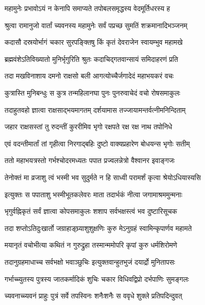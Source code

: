 \twolineshloka
{महामुनेः प्रभावोऽयं न केनापि समाप्यते}
{तपोबलसमृद्धस्य वेदमूर्तिधरस्य ह}%

\twolineshloka
{श्रुत्वा रामानुजो वार्तां च्यवनस्य महामुनेः}
{सर्वं पप्रच्छ सुमतिं शक्रमानादिभञ्जनम्}%


\twolineshloka
{कदासौ दस्रयोर्भागं चकार सुरपङ्क्तिषु}
{किं कृतं देवराजेन स्वायम्भुव महामखे}%


\twolineshloka
{ब्रह्मवंशेऽतिविख्यातो मुनिर्भृगुरिति श्रुतः}
{कदाचिद्गतवान्सायं समिदाहरणं प्रति}%

\twolineshloka
{तदा मखविनाशाय दमनो राक्षसो बली}
{आगत्योच्चैर्जगादेदं महाभयकरं वचः}%

\twolineshloka
{कुत्रास्ति मुनिबन्धुः स कुत्र तन्महिलानघा}
{पुनः पुनरुवाचेदं वचो रोषसमाकुलः}%

\twolineshloka
{तदाहुतवहो ज्ञात्वा राक्षसाद्भयमागतम्}
{दर्शयामास तज्जायामन्तर्वत्नीमनिन्दिताम्}%

\twolineshloka
{जहार राक्षसस्तां तु रुदन्तीं कुररीमिव}
{भृगो रक्षपते रक्ष रक्ष नाथ तपोनिधे}%

\twolineshloka
{एवं वदन्तीमार्तां तां गृहीत्वा निरगाद्बहिः}
{दुष्टो वाक्यप्रहारेण बोधयन्स भृगोः सतीम्}%

\twolineshloka
{ततो महाभयत्रस्तो गर्भश्चोदरमध्यतः}
{पपात प्रज्वलन्नेत्रो वैश्वानर इवाङ्गजः}%

\twolineshloka
{तेनोक्तं मा व्रजाशु त्वं भस्मी भव सुदुर्मते}
{न हि साध्वी परामर्शं कृत्वा श्रेयोऽधियास्यसि}%

\twolineshloka
{इत्युक्तः स पपाताशु भस्मीभूतकलेवरः}
{माता तदार्भकं नीत्वा जगामाश्रममुन्मनाः}%

\twolineshloka
{भृगुर्वह्निकृतं सर्वं ज्ञात्वा कोपसमाकुलः}
{शशाप सर्वभक्षस्त्वं भव दुष्टारिसूचक}%

\twolineshloka
{तदा शप्तोऽतिदुःखार्तो जग्राहाङ्घ्र्याशुशुक्षणिः}
{कुरु मेऽनुग्रहं स्वामिन्कृपार्णव महामते}%

\twolineshloka
{मयानृतं वचोभीत्या कथितं न गुरुद्रुहा}
{तस्मान्ममोपरि कृपां कुरु धर्मशिरोमणे}%

\twolineshloka
{तदानुग्रहमाधाच्च सर्वभक्षो भवाञ्छुचिः}
{इत्युक्तवान्हुतभुजं दयार्द्रो मुनितापसः}%

\twolineshloka
{गर्भाच्च्युतस्य पुत्रस्य जातकर्मादिकं शुचिः}
{चकार विधिवद्विप्रो दर्भपाणिः सुमङ्गलः}%

\twolineshloka
{च्यवनाच्च्यवनं प्राहुः पुत्रं सर्वे तपस्विनः}
{शनैःशनैः स ववृधे शुक्ले प्रतिपदिन्दुवत्}%

